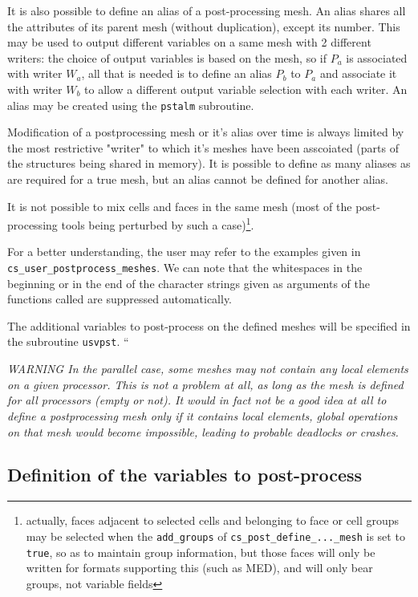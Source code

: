 {{{It is also possible to define an alias of a post-processing mesh. An
alias shares all the attributes of its parent mesh (without duplication),
except its number. This may be used to output different variables on a
same mesh with 2 different writers: the choice of output variables
is based on the mesh, so if $P_a$ is associated with writer $W_a$,
all that is needed is to define an alias $P_b$ to $P_a$ and associate
it with writer $W_b$ to allow a different output variable selection with
each writer. An alias may be created using the \texttt{pstalm} subroutine.

Modification of a postprocessing mesh or it's alias over time is always
limited by the most restrictive "writer" to which it's meshes have been
asscoiated (parts of the structures being shared in memory). It is
possible to define as many aliases as are required for a true mesh,
but an alias cannot be defined for another alias.

It is not possible to mix cells and faces in the same mesh (most of
the post-processing tools being perturbed by such a case)\footnote{actually,
faces adjacent to selected cells and belonging to face or cell groups
may be selected when the \texttt{add\_groups} of
\texttt{cs\_post\_define\_...\_mesh} is set to \texttt{true},
so as to maintain group information, but those faces will
only be written for formats supporting this (such as MED),
and will only bear groups, not variable fields}.

For a better understanding, the user may refer to the examples given in
\texttt{cs\_user\_postprocess\_meshes}. We can note that the whitespaces
in the beginning or in the end of the character strings given as arguments
of the functions called are suppressed automatically.

The additional variables to post-process on the defined meshes
will be specified in the subroutine \texttt{usvpst}.  ``

{\em WARNING In the parallel case, some meshes may not contain any
local elements on a given processor. This is not a problem at all, as
long as the mesh is defined for all processors (empty or not).
It would in fact not be a good idea at all to define a postprocessing
mesh only if it contains local elements, global operations on that
mesh would become impossible, leading to probable deadlocks or crashes.}

\subsection{Definition of the variables to post-process}

}}}
